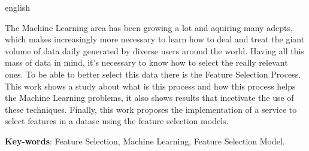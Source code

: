 \begin{resumo}[Abstract]
 \begin{otherlanguage*}{english}

 The Machine Learning area has been growing a lot and aquiring many adepts, which makes increasingly more necessary to learn how to deal and treat the giant volume of data daily generated by diverse users around the world. Having all this mass of data in mind, it's necessary to know how to select the really relevant ones. To be able to better select this data there is the Feature Selection Process. This work shows a study about what is this process and how this process helps the Machine Learning problems, it also shows results that incetivate the use of these techniques. Finally, this work proposes the implementation of a service to select features in a datase using the feature selection models.

   \vspace{\onelineskip}
 
   \noindent 
   \textbf{Key-words}: Feature Selection, Machine Learning, Feature Selection Model.
 \end{otherlanguage*}
\end{resumo}
